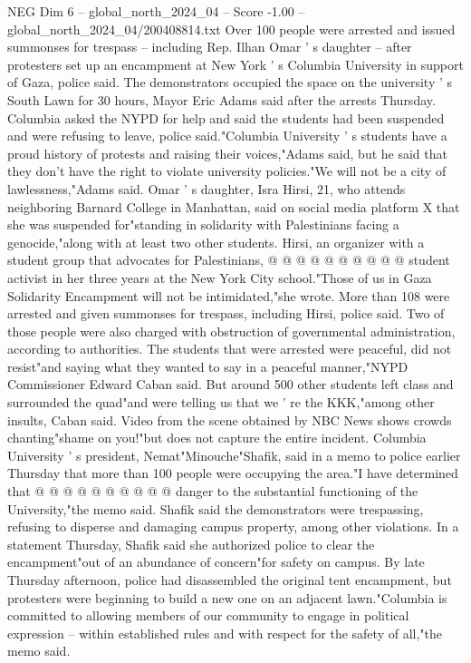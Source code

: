 \begin{textsample}{NEG Dim 6 – global\_north\_2024\_04 – Score -1.00 – global\_north\_2024\_04/200408814.txt}  \label{ex:f6_neg_340}
Over 100 people were arrested and issued summonses for trespass -- including Rep.
Ilhan Omar ' s daughter -- after protesters set up an encampment at New York ' s Columbia University in support of Gaza, police said.
The demonstrators occupied the space on the university ' s South Lawn for 30 hours, Mayor Eric Adams said after the arrests Thursday.
Columbia asked the NYPD for help and said the students had been suspended and were refusing to leave, police said."Columbia University ' s students have a proud history of protests and raising their voices,"Adams said, but he said that they don't have the right to violate university policies."We will not be a city of lawlessness,"Adams said.
Omar ' s daughter, Isra Hirsi, 21, who attends neighboring Barnard College in Manhattan, said on social media platform X that she was suspended for"standing in solidarity with Palestinians facing a genocide,"along with at least two other students.
Hirsi, an organizer with a student group that advocates for Palestinians, @ @ @ @ @ @ @ @ @ @ student activist in her three years at the New York City school."Those of us in Gaza Solidarity Encampment will not be intimidated,"she wrote.
More than 108 were arrested and given summonses for trespass, including Hirsi, police said.
Two of those people were also charged with obstruction of governmental administration, according to authorities.
The students that were arrested were peaceful, did not resist"and saying what they wanted to say in a peaceful manner,"NYPD Commissioner Edward Caban said.
But around 500 other students left class and surrounded the quad"and were telling us that we ' re the KKK,"among other insults, Caban said.
Video from the scene obtained by NBC News shows crowds chanting"shame on you!"but does not capture the entire incident.
Columbia University ' s president, Nemat"Minouche"Shafik, said in a memo to police earlier Thursday that more than 100 people were occupying the area."I have determined that @ @ @ @ @ @ @ @ @ @ danger to the substantial functioning of the University,"the memo said.
Shafik said the demonstrators were trespassing, refusing to disperse and damaging campus property, among other violations.
In a statement Thursday, Shafik said she authorized police to clear the encampment"out of an abundance of concern"for safety on campus.
By late Thursday afternoon, police had disassembled the original tent encampment, but protesters were beginning to build a new one on an adjacent lawn."Columbia is committed to allowing members of our community to engage in political expression -- within established rules and with respect for the safety of all,"the memo said.

\end{textsample}
